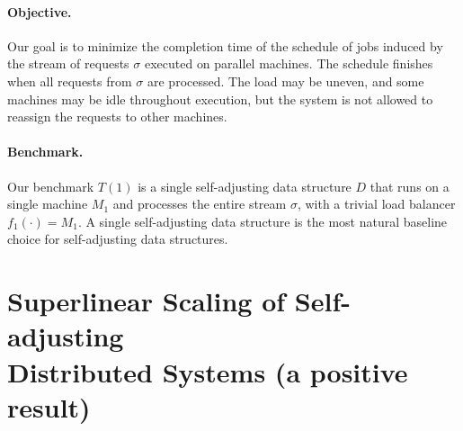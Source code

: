 \paragraph*{Objective.}
Our goal is to minimize the completion time of the schedule of jobs induced by the stream of requests $\sigma$ executed on parallel machines.
The schedule finishes when all requests from $\sigma$ are processed.
The load may be uneven, and some machines may be idle throughout execution, but the system is not allowed to reassign the requests to other machines.




\paragraph*{Benchmark.}
Our benchmark $T(1)$ is a single self-adjusting data structure $D$ that runs on a single machine $M_1$
and processes the entire stream $\sigma$, with a trivial load balancer $f_1(\cdot) = M_1$.
A single self-adjusting data structure is the most natural baseline choice for self-adjusting data structures. 



\section{Superlinear Scaling of Self-adjusting\\ Distributed Systems (a positive result)}
\label{sec:app:arch-scaling}







